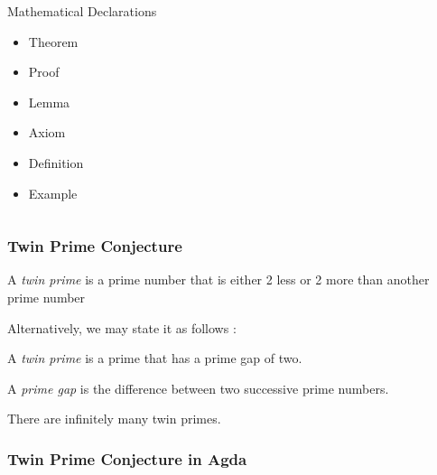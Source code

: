 \documentclass[10pt]{beamer}
\begin{document}
\begin{frame}

\begin{columns}

\begin{column}{0.4 \textwidth}

\begin{block}{Mathematical Declarations}
  \begin{itemize}
    \item Theorem
    \item Proof
    \item Lemma
    \item Axiom
    \item Definition
    \item Example 
  \end{itemize}
\end{block}

\end{column}

\begin{column}{0.7 \textwidth}

% 

\end{column}
\end{columns}
\end{frame}


\begin{frame}
\frametitle{Twin Prime Conjecture}
\begin{Definition}
A \emph{twin prime} is a prime number that is either 2 less or 2 more than another prime number
\end{Definition}
Alternatively, we may state it as follows :
\begin{Definition}
A \emph{twin prime} is a prime that has a prime gap of two.
\end{Definition}
\begin{Definition}
A \emph{prime gap} is the difference between two successive prime numbers.
\end{Definition}

\begin{theorem}
There are infinitely many twin primes.
\end{theorem} 

\end{frame}

\begin{frame}

\frametitle{Twin Prime Conjecture in Agda}

% 

\end{frame}
\end{document}

